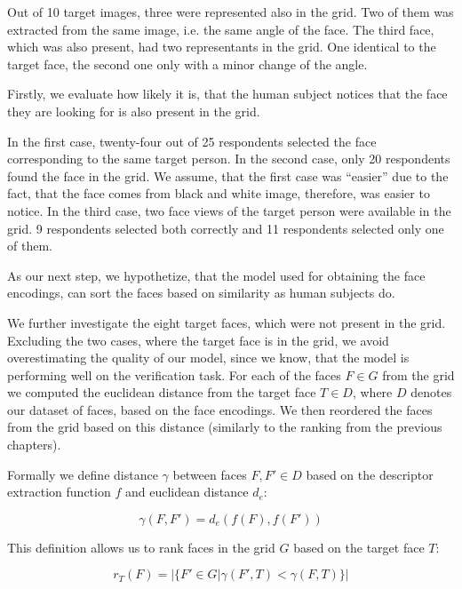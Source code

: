 
Out of 10 target images, three were represented also in the grid. Two of them was extracted from the same image, i.e. the same angle of the face. The third face, which was also present, had two representants in the grid. One identical to the target face, the second one only with a minor change of the angle.

Firstly, we evaluate how likely it is, that the human subject notices that the face they are looking for is also present in the grid.

In the first case, twenty-four out of 25 respondents selected the face corresponding to the same target person. In the second case, only 20 respondents found the face in the grid. We assume, that the first case was ``easier'' due to the fact, that the face comes from black and white image, therefore, was easier to notice. In the third case, two face views of the target person were available in the grid. 9 respondents selected both correctly and 11 respondents selected only one of them. 

As our next step, we hypothetize, that the model used for obtaining the face encodings, can sort the faces based on similarity as human subjects do.

We further investigate the eight target faces, which were not present in the grid. Excluding the two cases, where the target face is in the grid, we avoid overestimating the quality of our model, since we know, that the model is performing well on the verification task. For each of the faces $F\in G$ from the grid  we computed the euclidean distance from the target face $T\in D$, where $D$ denotes our dataset of faces, based on the face encodings. We then reordered the faces from the grid based on this distance (similarly to the ranking from the previous chapters). 

Formally we define distance $\gamma$ between faces $F, F' \in D$ based on the descriptor extraction function $f$ and euclidean distance $d_e$:

$$
\gamma(F, F') = d_e(f(F), f(F'))
$$

This definition allows us to rank faces in the grid $G$ based on the target face $T$:

$$
    r_T(F) = |\{F'\in G|\gamma(F', T) < \gamma(F, T)\}|
$$

